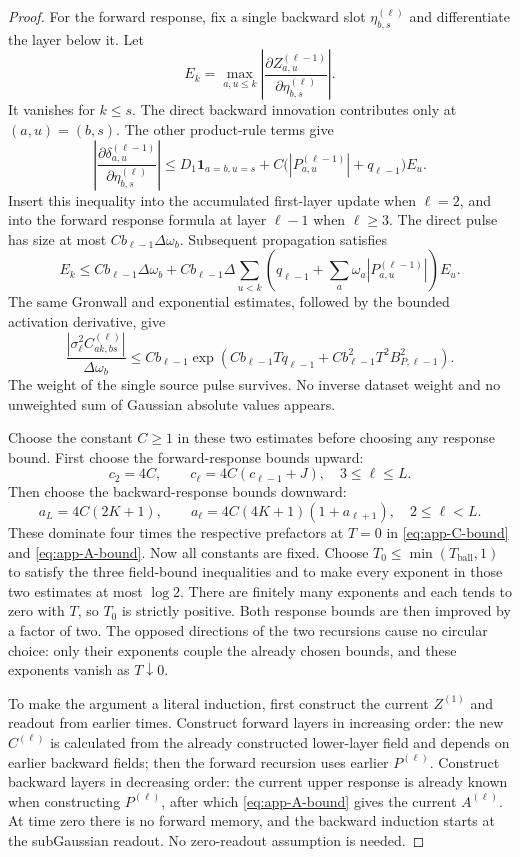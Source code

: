 \begin{proof}
For the forward response, fix a single backward slot
$\eta_{b,s}^{(\ell)}$ and differentiate the layer below it.  Let
\[
 E_k=\max_{a,u\le k}
 \left|\frac{\partial Z_{a,u}^{(\ell-1)}}
                  {\partial\eta_{b,s}^{(\ell)}}\right|.
\]
It vanishes for $k\le s$.  The direct backward innovation contributes
only at $(a,u)=(b,s)$.  The other product-rule terms give
\[
 \left|\frac{\partial\delta_{a,u}^{(\ell-1)}}
                  {\partial\eta_{b,s}^{(\ell)}}\right|
 \le D_1\mathbf{1}_{a=b,u=s}
       +C\bigl(|P_{a,u}^{(\ell-1)}|+q_{\ell-1}\bigr)E_u.
\]
Insert this inequality into the accumulated first-layer update when
$\ell=2$, and into the forward response formula at layer $\ell-1$
when $\ell\ge3$.  The direct pulse has size at most
$Cb_{\ell-1}\Delta\omega_b$.  Subsequent propagation satisfies
\[
 E_k\le Cb_{\ell-1}\Delta\omega_b+
 Cb_{\ell-1}\Delta\sum_{u<k}
 \left(q_{\ell-1}+\sum_a\omega_a|P_{a,u}^{(\ell-1)}|\right)E_u.
\]
The same Gronwall and exponential estimates, followed by the bounded
activation derivative, give
\begin{equation}
 \frac{|\sigma_\ell^2C_{ak,bs}^{(\ell)}|}{\Delta\omega_b}
 \le Cb_{\ell-1}
 \exp\!\left(Cb_{\ell-1}Tq_{\ell-1}+
          Cb_{\ell-1}^2T^2B_{P,\ell-1}^2\right).
 \label{eq:app-C-bound}
\end{equation}
The weight of the single source pulse survives.  No inverse dataset
weight and no unweighted sum of Gaussian absolute values appears.

Choose the constant $C\ge1$ in these two estimates before choosing any
response bound.  First choose the forward-response bounds upward:
\[
 c_2=4C,\qquad c_\ell=4C(c_{\ell-1}+J),\quad3\le\ell\le L.
\]
Then choose the backward-response bounds downward:
\[
 a_L=4C(2K+1),\qquad
 a_\ell=4C(4K+1)(1+a_{\ell+1}),\quad2\le\ell<L.
\]
These dominate four times the respective prefactors at $T=0$ in
\eqref{eq:app-C-bound} and \eqref{eq:app-A-bound}.  Now all constants
are fixed.  Choose $T_0\le\min(T_{\mathrm{ball}},1)$ to satisfy the
three field-bound inequalities and to make every exponent in those two
estimates at most $\log2$.  There are finitely many exponents and each
tends to zero with $T$, so $T_0$ is strictly positive.  Both response
bounds are then improved by a factor of two.  The opposed directions of
the two recursions cause no circular choice: only their exponents couple
the already chosen bounds, and these exponents vanish as $T\downarrow0$.

To make the argument a literal induction, first construct the current
$Z^{(1)}$ and readout from earlier times.  Construct forward layers in
increasing order: the new $C^{(\ell)}$ is calculated from the already
constructed lower-layer field and depends on earlier backward fields;
then the forward recursion uses earlier $P^{(\ell)}$.  Construct
backward layers in decreasing order: the current upper response is
already known when constructing $P^{(\ell)}$, after which
\eqref{eq:app-A-bound} gives the current $A^{(\ell)}$.  At time zero
there is no forward memory, and the backward induction starts at the
subGaussian readout.  No zero-readout assumption is needed.


\end{proof}
